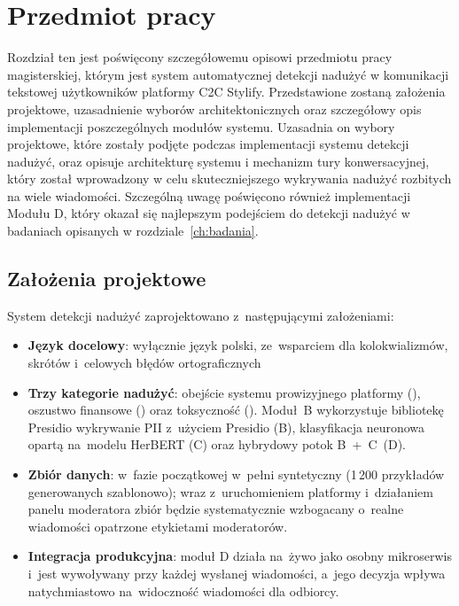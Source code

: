 \chapter{Przedmiot pracy}
\label{ch:przedmiot}

Rozdział ten jest poświęcony szczegółowemu opisowi przedmiotu pracy magisterskiej, którym jest system automatycznej detekcji nadużyć w komunikacji tekstowej użytkowników platformy C2C Stylify. Przedstawione zostaną założenia projektowe, uzasadnienie wyborów architektonicznych oraz szczegółowy opis implementacji poszczególnych modułów systemu.
Uzasadnia on wybory projektowe, które zostały podjęte podczas implementacji systemu detekcji nadużyć, oraz opisuje architekturę systemu i mechanizm tury konwersacyjnej, który został wprowadzony w celu skuteczniejszego wykrywania nadużyć rozbitych na wiele wiadomości. Szczególną uwagę poświęcono również implementacji Modułu D, który okazał się najlepszym podejściem do detekcji nadużyć w badaniach opisanych w rozdziale~\ref{ch:badania}.

\section{Założenia projektowe}
System detekcji nadużyć zaprojektowano z~następującymi założeniami:

\begin{itemize}
  \item \textbf{Język docelowy}: wyłącznie język polski, ze~wsparciem
    dla kolokwializmów, skrótów i~celowych błędów ortograficznych

  \item \textbf{Trzy kategorie nadużyć}: obejście systemu prowizyjnego
    platformy (), oszustwo finansowe ()
    oraz toksyczność ().
  Moduł~B wykorzystuje bibliotekę Presidio \cite{bib:presidio}
    wykrywanie PII z~użyciem Presidio (B), klasyfikacja neuronowa
    opartą na~modelu HerBERT (C) oraz hybrydowy potok B~+~C~(D).

  \item \textbf{Zbiór danych}: w~fazie początkowej w~pełni syntetyczny
    (1\,200 przykładów generowanych szablonowo); wraz z~uruchomieniem
    platformy i~działaniem panelu moderatora zbiór będzie systematycznie
    wzbogacany o~realne wiadomości opatrzone etykietami moderatorów.

  \item \textbf{Integracja produkcyjna}: moduł D działa
    na~żywo jako osobny mikroserwis i~jest wywoływany przy każdej
    wysłanej wiadomości, a~jego decyzja wpływa natychmiastowo
    na~widoczność wiadomości dla odbiorcy.
\end{itemize}

